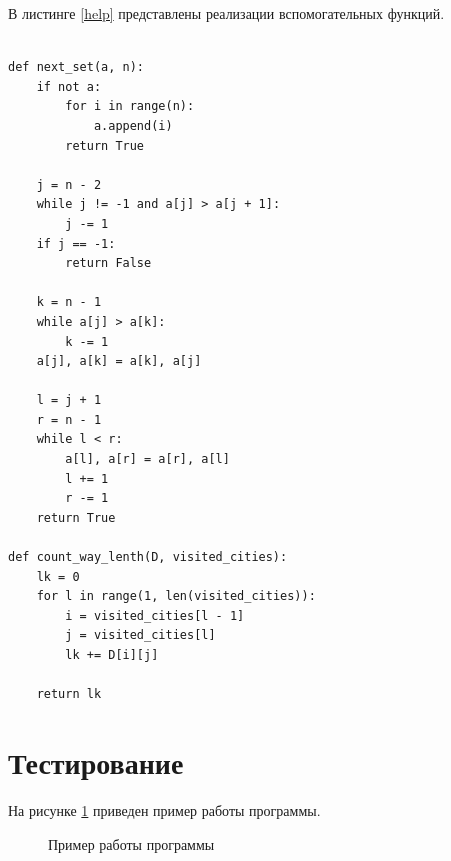\clearpage
В листинге \ref{help} представлены реализации вспомогательных функций.


\begin{lstlisting}[caption=Вспомогательные функции,
	label={help}]

def next_set(a, n):
	if not a:
		for i in range(n):
			a.append(i)
		return True
	
	j = n - 2
	while j != -1 and a[j] > a[j + 1]:
		j -= 1
	if j == -1:
		return False  
	
	k = n - 1
	while a[j] > a[k]:
		k -= 1
	a[j], a[k] = a[k], a[j]
	
	l = j + 1
	r = n - 1
	while l < r:
		a[l], a[r] = a[r], a[l]
		l += 1
		r -= 1
	return True

def count_way_lenth(D, visited_cities):
	lk = 0
	for l in range(1, len(visited_cities)):
		i = visited_cities[l - 1]
		j = visited_cities[l]
		lk += D[i][j]
	
	return lk
\end{lstlisting}


\clearpage
\section{Тестирование}

На рисунке \ref{fig:work_example} приведен пример работы программы.


\begin{figure}[h!]
	
	
	\caption{Пример работы программы}
	
	\label{fig:work_example}
	
\end{figure}

